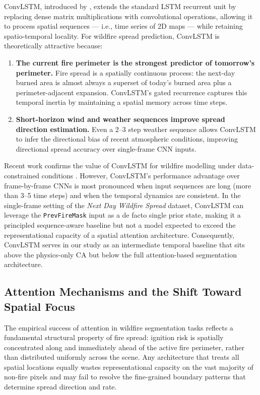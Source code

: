 ConvLSTM, introduced by \citet{shi2015convolutional}, extends the standard LSTM recurrent unit by replacing dense matrix multiplications with convolutional operations, allowing it to process spatial sequences — i.e., time series of 2D maps — while retaining spatio-temporal locality.
For wildfire spread prediction, ConvLSTM is theoretically attractive because:

\begin{enumerate}
    \item \textbf{The current fire perimeter is the strongest predictor of tomorrow's perimeter.}
          Fire spread is a spatially continuous process: the next-day burned area is almost always a superset of today's burned area plus a perimeter-adjacent expansion.
          ConvLSTM's gated recurrence captures this temporal inertia by maintaining a spatial memory across time steps.

    \item \textbf{Short-horizon wind and weather sequences improve spread direction estimation.}
          Even a 2–3 step weather sequence allows ConvLSTM to infer the directional bias of recent atmospheric conditions, improving directional spread accuracy over single-frame CNN inputs.
\end{enumerate}

Recent work confirms the value of ConvLSTM for wildfire modelling under data-constrained conditions \citep{naturalhazards2025convlstm}.
However, ConvLSTM's performance advantage over frame-by-frame CNNs is most pronounced when input sequences are long (more than 3–5 time steps) and when the temporal dynamics are consistent.
In the single-frame setting of the \textit{Next Day Wildfire Spread} dataset, ConvLSTM can leverage the \texttt{PrevFireMask} input as a de facto single prior state, making it a principled sequence-aware baseline but not a model expected to exceed the representational capacity of a spatial attention architecture.
Consequently, ConvLSTM serves in our study as an intermediate temporal baseline that sits above the physics-only CA but below the full attention-based segmentation architecture.

\subsection{Attention Mechanisms and the Shift Toward Spatial Focus}
\label{sec:sota_attention}

The empirical success of attention in wildfire segmentation tasks reflects a fundamental structural property of fire spread: ignition risk is spatially concentrated along and immediately ahead of the active fire perimeter, rather than distributed uniformly across the scene.
Any architecture that treats all spatial locations equally wastes representational capacity on the vast majority of non-fire pixels and may fail to resolve the fine-grained boundary patterns that determine spread direction and rate.

